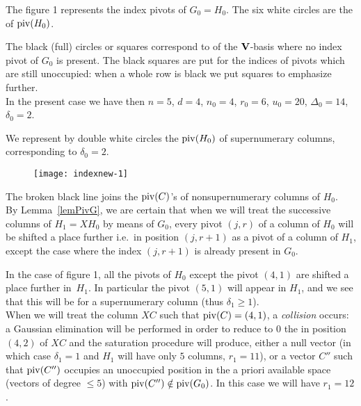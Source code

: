 \medskip {}

\smallskip
The figure 1 represents the index pivots of $G_0=H_0$.
The six white circles are the \elts of $\mathrm{piv}(H_0)$.

The black (full) circles or squares correspond to 
  \elts of the $\mathbf{V}$-basis where no  index pivot of $G_0$ is present.
The black squares are put for the indices of pivots which are still unoccupied: when a whole row is black we put squares to  emphasize further.
\\
In the present case we have then  $n=5$, $d=4$, $n_0=4$, $r_0=6$, $u_0=20$,
$\Delta_0=14$, $\delta_0=2$.

We represent by double white circles the \elts $\mathrm{piv}(H_0)$ of supernumerary columns,  corresponding to $\delta_0=2$.

\begin{figure}[ht]
%
\begin{center}
\texttt{[image: indexnew-1]}

\caption[figure 1]
{\label{fig1} }

\end{center}
\end{figure}


The broken black line joins the
$\mathrm{piv}(C)$’s of nonsupernumerary columns of $H_0$. \\
By Lemma~\ref{lemPivG}, we are certain that when we will treat the successive  columns of $H_1=XH_0$ by means of $G_0$,
every pivot  $(j,r)$ of a column of $H_0$ will be shifted a place further
i.e.\ in position $(j,r+1)$ as a  pivot of a 
column  of $H_1$, except the case where the index
$(j,r+1)$  is already present in  $G_0$.



In the case of figure 1, all the pivots of $H_0$ except the pivot $(4,1)$ are shifted a place further in~$H_1$. In particular the pivot $(5,1)$ will appear in $H_1$,
and we see that this will be for a supernumerary column (thus $\delta_1\geq 1$).
\\
When we will treat the 
column $XC$ such that $\mathrm{piv}(C)=(4,1)$, a \textsl{collision} occurs:
a Gaussian elimination will be performed in order to reduce to  $0$ the \coe in position $(4,2)$ of $XC$
and the  saturation procedure will produce, either a null vector
(in which case  $\delta_1=1$ and $H_1$ will have only $5$ columns, $r_1=11$), or a vector $C''$ such that $\mathrm{piv}(C'')$ occupies an unoccupied position in the  a priori available 
space (vectors of degree $\leq 5$)
with \ncrt  $\mathrm{piv}(C'')\notin \mathrm{piv}(G_0)$.
In this case we will have $r_1=12$.

